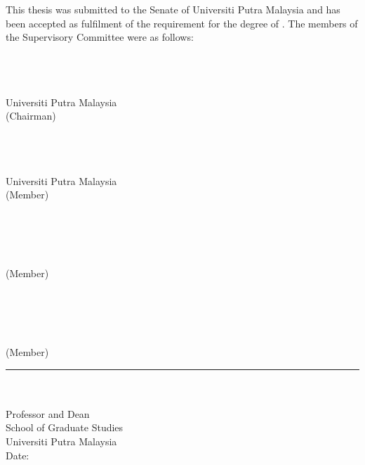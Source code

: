 \newpage

This thesis was submitted to the Senate of Universiti Putra Malaysia and has
been accepted as fulfilment of the requirement for the degree of \infodegreename. The members of the Supervisory Committee were as follows:

\textbf{\infosupervisorname \infosupervisordegree} \\
\infosupervisortitle \\
\infosupervisorfaculty \\
Universiti Putra Malaysia \\
(Chairman)

\textbf{\infocommitteeonename \infocommitteeonedegree} \\
\infocommitteeonetitle \\
\infocommitteeonefaculty \\
Universiti Putra Malaysia \\
(Member)

\textbf{\infocommitteetwoname \infocommitteetwodegree} \\
\infocommitteetwotitle \\
\infocommitteetwofaculty \\
\infocommitteetwouniversity \\
(Member)

\textbf{\infocommitteethreename \infocommitteethreedegree} \\
\infocommitteethreetitle \\
\infocommitteethreefaculty \\
\infocommitteethreeuniversity \\
(Member)

\begin{minipage}[t]{0.5\textwidth}
    \hfill
\end{minipage}
\begin{minipage}[t]{0.5\textwidth}
    \rule{6cm}{0.4pt} \\
    \textbf{\infodeanname \infodeandegree} \\
    Professor and Dean \\
    School of Graduate Studies \\
    Universiti Putra Malaysia \\

    Date:
\end{minipage}